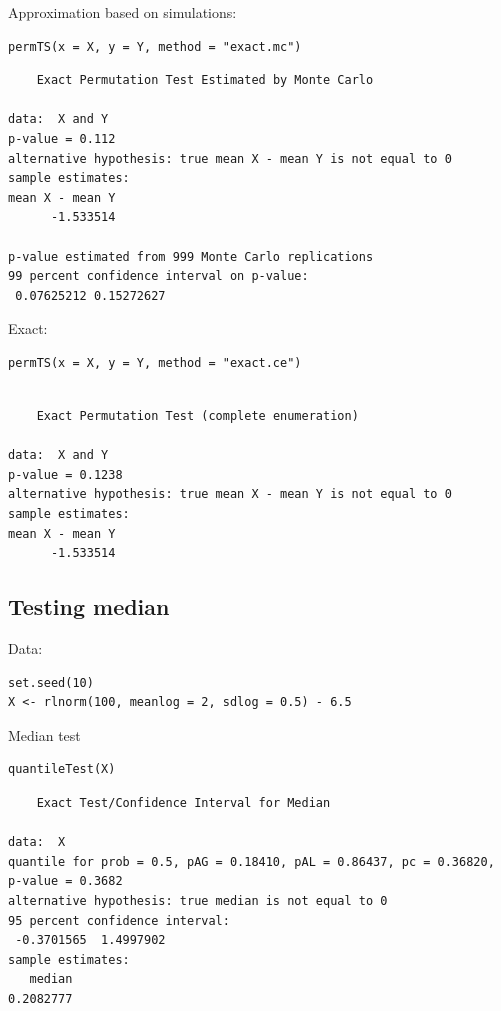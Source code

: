 \documentclass{article}
\begin{document}
Approximation based on simulations:
\lstset{language=r,label= ,caption= ,captionpos=b,numbers=none}
\begin{lstlisting}
permTS(x = X, y = Y, method = "exact.mc")
\end{lstlisting}

\begin{verbatim}
	Exact Permutation Test Estimated by Monte Carlo

data:  X and Y
p-value = 0.112
alternative hypothesis: true mean X - mean Y is not equal to 0
sample estimates:
mean X - mean Y 
      -1.533514 

p-value estimated from 999 Monte Carlo replications
99 percent confidence interval on p-value:
 0.07625212 0.15272627
\end{verbatim}

Exact:
\lstset{language=r,label= ,caption= ,captionpos=b,numbers=none}
\begin{lstlisting}
permTS(x = X, y = Y, method = "exact.ce")
\end{lstlisting}

\begin{verbatim}

	Exact Permutation Test (complete enumeration)

data:  X and Y
p-value = 0.1238
alternative hypothesis: true mean X - mean Y is not equal to 0
sample estimates:
mean X - mean Y 
      -1.533514
\end{verbatim}

\subsection{Testing median}
\label{sec:orga9e6177}

Data:
\lstset{language=r,label= ,caption= ,captionpos=b,numbers=none}
\begin{lstlisting}
set.seed(10)
X <- rlnorm(100, meanlog = 2, sdlog = 0.5) - 6.5
\end{lstlisting}

Median test
\lstset{language=r,label= ,caption= ,captionpos=b,numbers=none}
\begin{lstlisting}
quantileTest(X)
\end{lstlisting}

\begin{verbatim}
	Exact Test/Confidence Interval for Median

data:  X
quantile for prob = 0.5, pAG = 0.18410, pAL = 0.86437, pc = 0.36820, p-value = 0.3682
alternative hypothesis: true median is not equal to 0
95 percent confidence interval:
 -0.3701565  1.4997902
sample estimates:
   median 
0.2082777
\end{verbatim}
\end{document}

